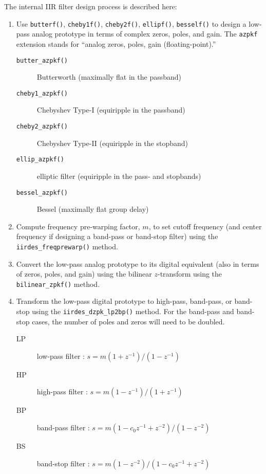 The internal IIR filter design process is described here:
\begin{enumerate}
\item Use {\tt butterf()}, {\tt cheby1f()}, {\tt cheby2f()}, {\tt ellipf()},
      {\tt besself()} to design a low-pass analog prototype in terms of
      complex zeros, poles, and gain.
      The {\tt azpkf} extension stands for ``analog zeros, poles, gain
      (floating-point).''

    \begin{description}
    \item[{\tt butter\_azpkf()}] Butterworth (maximally flat in the passband)
    \item[{\tt cheby1\_azpkf()}] Chebyshev Type-I (equiripple in the passband)
    \item[{\tt cheby2\_azpkf()}] Chebyshev Type-II (equiripple in the stopband)
    \item[{\tt ellip\_azpkf() }] elliptic filter (equiripple in the pass- and
        stopbands)
    \item[{\tt bessel\_azpkf()}] Bessel (maximally flat group delay)
    \end{description}

\item Compute frequency pre-warping factor, $m$, to set cutoff frequency (and
      center frequency if designing a band-pass or band-stop filter) using the
      {\tt iirdes\_freqprewarp()} method.

\item Convert the low-pass analog prototype to its digital equivalent (also in
      terms of zeros, poles, and gain) using the bilinear $z$-transform using
      the {\tt bilinear\_zpkf()} method.

\item Transform the low-pass digital prototype to high-pass, band-pass, or
      band-stop using the {\tt iirdes\_dzpk\_lp2bp()} method.
      For the band-pass and band-stop cases, the number of poles and zeros
      will need to be doubled.
    \begin{description}
    \item[LP] low-pass filter   : $s = m (1+z^{-1}) / (1-z^{-1})$
    \item[HP] high-pass filter  : $s = m (1-z^{-1}) / (1+z^{-1})$
    \item[BP] band-pass filter  : $s = m (1-c_0 z^{-1}+z^{-2}) / (1-z^{-2})$
    \item[BS] band-stop filter  : $s = m (1-z^{-2}) / (1-c_0 z^{-1}+z^{-2})$
    \end{description}


\end{enumerate}
